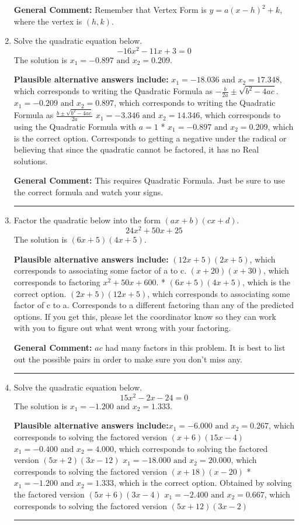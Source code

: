 \documentclass{extbook}[14pt]
\newcommand{\litem}[1]{\item #1

\rule{\textwidth}{0.4pt}}
\begin{document}
\begin{enumerate}
{\textbf{General Comment:} Remember that Vertex Form is $y = a(x-h)^2+k$, where the vertex is $(h, k)$.
}
\litem{
Solve the quadratic equation below.
\[ -16x^{2} -11 x + 3 = 0 \]The solution is \( x_1 = -0.897 \text{ and } x_2 = 0.209 \).\begin{enumerate}[label=\Alph*.]
\textbf{Plausible alternative answers include:} $x_1 = -18.036 \text{ and } x_2 = 17.348$, which corresponds to writing the Quadratic Formula as $-\frac{b}{2a} \pm \sqrt{b^2 - 4ac}$.
 $x_1 = -0.209 \text{ and } x_2 = 0.897$, which corresponds to writing the Quadratic Formula as $\frac{b \pm \sqrt{b^2 - 4ac}}{2a}$
 $x_1 = -3.346 \text{ and } x_2 = 14.346$, which corresponds to using the Quadratic Formula with $a=1$
* $x_1 = -0.897 \text{ and } x_2 = 0.209$, which is the correct option.
Corresponds to getting a negative under the radical or believing that since the quadratic cannot be factored, it has no Real solutions.
\end{enumerate}

\textbf{General Comment:} This requires Quadratic Formula. Just be sure to use the correct formula and watch your signs.
}
\litem{
Factor the quadratic below into the form $(ax+b)(cx+d)$.
\[ 24x^{2} +50 x + 25 \]The solution is \( (6x + 5)(4x + 5) \).\begin{enumerate}[label=\Alph*.]
\textbf{Plausible alternative answers include:} $(12x + 5)(2x + 5)$, which corresponds to associating some factor of a to c.
 $(x + 20)(x + 30)$, which corresponds to factoring $x^{2} +50 x + 600$.
* $(6x + 5)(4x + 5)$, which is the correct option.
 $(2x + 5)(12x + 5)$, which corresponds to associating some factor of c to a.
 Corresponds to a different factoring than any of the predicted options. If you get this, please let the coordinator know so they can work with you to figure out what went wrong with your factoring.
\end{enumerate}

\textbf{General Comment:} $ac$ had many factors in this problem. It is best to list out the possible pairs in order to make sure you don't miss any.
}
\litem{
Solve the quadratic equation below.
\[ 15x^{2} -2 x -24 = 0 \]The solution is \( x_1 = -1.200 \text{ and } x_2 = 1.333 \).\begin{enumerate}[label=\Alph*.]
\textbf{Plausible alternative answers include:}$x_1 = -6.000 \text{ and } x_2 = 0.267$, which corresponds to solving the factored version $(x + 6)(15x -4)$
$x_1 = -0.400 \text{ and } x_2 = 4.000$, which corresponds to solving the factored version $(5x + 2)(3x -12)$
$x_1 = -18.000 \text{ and } x_2 = 20.000$, which corresponds to solving the factored version $(x + 18)(x -20)$
* $x_1 = -1.200 \text{ and } x_2 = 1.333$, which is the correct option. Obtained by solving the factored version $(5x + 6)(3x -4)$
$x_1 = -2.400 \text{ and } x_2 = 0.667$, which corresponds to solving the factored version $(5x + 12)(3x -2)$
\end{enumerate}

}
\end{enumerate}
\end{document}
